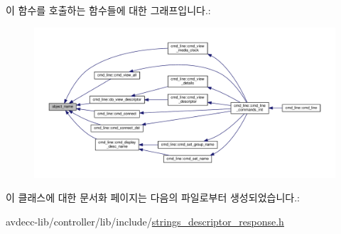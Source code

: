 이 함수를 호출하는 함수들에 대한 그래프입니다.\+:
\nopagebreak
\begin{figure}[H]
\begin{center}
\leavevmode
\includegraphics[width=350pt]{classavdecc__lib_1_1descriptor__response__base_a133f7774946d80f82b8aaaa4cfbb7361_icgraph}
\end{center}
\end{figure}




이 클래스에 대한 문서화 페이지는 다음의 파일로부터 생성되었습니다.\+:\begin{DoxyCompactItemize}
\item 
avdecc-\/lib/controller/lib/include/\hyperlink{strings__descriptor__response_8h}{strings\+\_\+descriptor\+\_\+response.\+h}\end{DoxyCompactItemize}
